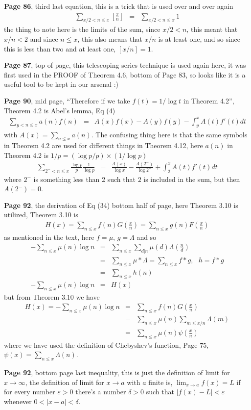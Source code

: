 \documentclass[aps,preprint,preprintnumbers,nofootinbib,showpacs,prd]{revtex4-1}
\newcommand{\nbea}{\begin{eqnarray*}}
\newcommand{\neea}{\end{eqnarray*}}
\begin{document}
{\bf Page 86}, third last equation, this is a trick that is used over and over again
%
\nbea
\sum_{x/2 < n \le x} \left\lbrack \frac{x}{n} \right \rbrack & = & \sum_{x/2 < n \le x} 1
\neea
%
the thing to note here is the limits of the sum, since $x/2 < n$, this meant that $x/n < 2$ and since $n\le x$, this also means that $x/n$ is at least one, and so since this is less than two and at least one, $[x/n] = 1$.

{\bf Page 87}, top of page, this telescoping series technique is used again here, it was first used in the PROOF of Theorem 4.6, bottom of Page 83, so looks like it is a useful tool to be kept in our arsenal :)

{\bf Page 90}, mid page, ``Therefore if we take $f(t) = 1/\log t$ in Theorem 4.2'', Theorem 4.2 is Abel's lemma, Eq (4)
%
\nbea
\sum_{y < n \le x} a(n)f(n) & = & A(x)f(x) - A(y)f(y) - \int_y^x A(t)f'(t) dt
\neea
%
with $A(x) = \sum_{n\le x} a(n)$. The confusing thing here is that the same symbols in Theorem 4.2 are used for different things in Theorem 4.12, here $a(n)$ in Theorem 4.2 is $1/p = (\log p/p)\times(1/\log p)$
%
\nbea
\sum_{2^- < n \le x}\frac{\log p}{p} \frac{1}{\log p} & = & \frac{A(x)}{\log x} - \frac{A(2^-)}{\log 2^-} + \int_2^x A(t)f'(t) dt
\neea
%
where $2^-$ is something less than 2 such that $2$ is included in the sum, but then $A(2^-)=0$.

{\bf Page 92}, the derivation of Eq (34) bottom half of page, here Theorem 3.10 is utilized, Theorem 3.10 is
%
\nbea
H(x) = \sum_{n\le x}f(n)G\left(\frac{x}{n}\right) = \sum_{n\le x}g(n)F\left(\frac{x}{n}\right)
\neea
%
as mentioned in the text, here $f=\mu$, $g=\Lambda$ and so
%
\nbea
-\sum_{n\le x} \mu(n)\log n & = & \sum_{n\le x}\sum_{d|n} \mu(d)\Lambda\left(\frac{n}{d}\right) \\
& = & \sum_{n\le x} \mu * \Lambda  = \sum_{n\le x} f * g, ~~~ h = f * g\\
& = & \sum_{n \le x} h(n) \\
-\sum_{n\le x} \mu(n)\log n & = & H(x)
\neea
%
but from Theorem 3.10 we have
%
\nbea
H(x) = -\sum_{n\le x} \mu(n)\log n & = & \sum_{n\le x}f(n)G\left(\frac{x}{n}\right) \\
& = & \sum_{n\le x} \mu(n) \sum_{m\le x/n} \Lambda(m) \\
& = & \sum_{n\le x} \mu(n)  \psi \left ( \frac{x}{n}\right )
\neea
%
where we have used the definition of Chebyshev's function, Page 75, $\psi(x) = \sum_{n\le x} \Lambda(n)$.

{\bf Page 92}, bottom page last inequality, this is just the definition of limit for $x\to\infty$, the definition of limit for $x\to a$ with $a$ finite is, $\lim_{x\to a} f(x) = L$ if for every number $\varepsilon>0$ there's a number $\delta>0$ such that $|f(x)-L|<\varepsilon$ whenever $0 < |x-a| <\delta$.
\end{document}
